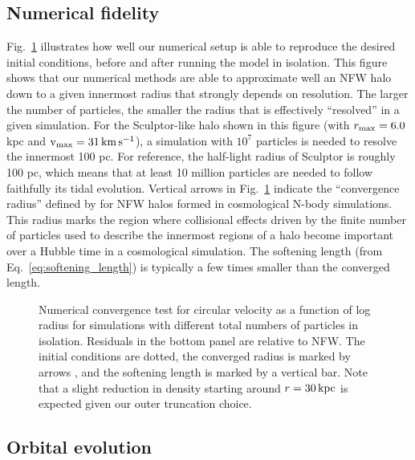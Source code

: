 \subsection{Numerical fidelity}\label{numerical-fidelity}

Fig.~\ref{fig:numerical_convergence} illustrates how well our numerical
setup is able to reproduce the desired initial conditions, before and
after running the model in isolation. This figure shows that our
numerical methods are able to approximate well an NFW halo down to a
given innermost radius that strongly depends on resolution. The larger
the number of particles, the smaller the radius that is effectively
``resolved'' in a given simulation. For the Sculptor-like halo shown in
this figure (with \(r_{\rm max} = 6.0\,\)kpc and \({\rm v}_{\rm max} = 31\,{\rm km\,s^{-1}}\)), a
simulation with \(10^7\) particles is needed to resolve the innermost
100 pc. For reference, the half-light radius of Sculptor is roughly 100
pc, which means that at least 10 million particles are needed to follow
faithfully its tidal evolution. Vertical arrows in
Fig.~\ref{fig:numerical_convergence} indicate the ``convergence radius''
defined by \citet[their eq. 13]{power+2003} for NFW halos formed in
cosmological N-body simulations. This radius marks the region where
collisional effects driven by the finite number of particles used to
describe the innermost regions of a halo become important over a Hubble
time in a cosmological simulation. The softening length (from
Eq.~\ref{eq:softening_length}) is typically a few times smaller than the
converged length.

\begin{figure}
\centering
{}
\caption[Numerical convergence of the N-body simulation]{Numerical
convergence test for circular velocity as a function of log radius for
simulations with different total numbers of particles in isolation.
Residuals in the bottom panel are relative to NFW. The initial
conditions are dotted, the converged radius is marked by arrows
\citep[eq. 13,][]{power+2003}, and the softening length is marked by a
vertical bar. Note that a slight reduction in density starting around
\(r = 30\,{\rm kpc}\) is expected given our outer truncation
choice.}\label{fig:numerical_convergence}
\end{figure}

\subsection{Orbital evolution}\label{orbital-evolution}

